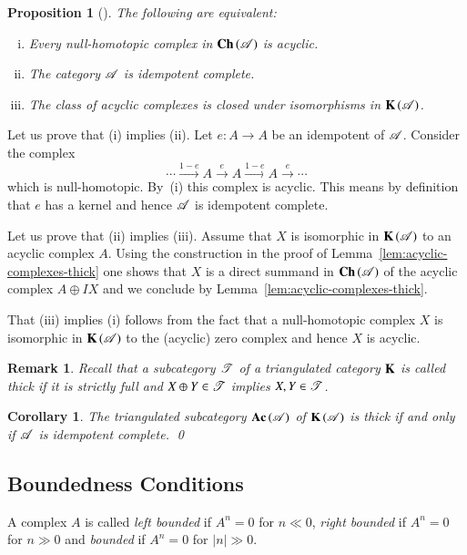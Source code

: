 \documentclass[1p]{elsarticle}
\makeatletter
\renewenvironment{proof}[1][\proofname]{\par
  \pushQED{\qed}%
  \normalfont \topsep6\p@\@plus6\p@\relax
  \trivlist
  \item[\hskip\labelsep
        \scshape
    #1\@addpunct{.}]\ignorespaces
}{%
  \popQED\endtrivlist\@endpefalse
}
\theoremstyle{mythm}
\newtheorem{Cor}[Thm]{Corollary}
\newtheorem{Prop}[Thm]{Proposition}
\theoremstyle{mydef}
\newtheorem{Rem}[Thm]{Remark}
\makeatother
\begin{document}
\begin{Prop}[{\cite[11.2]{MR1421815}}]
  \label{prop:ac-cxes-strictly-full-iff-karoubian}
  The following are equivalent:
  \begin{enumerate}[(i)]
    \item
      Every null-homotopic complex in $\operatorname{\mathbf{Ch}}{(\operatorname{\mathscr{A}})}$ is acyclic.
    \item
      The category $\operatorname{\mathscr{A}}$ is idempotent complete.
      
    \item
      The class of acyclic complexes is closed under isomorphisms in
      $\operatorname{\mathbf{K}}{(\operatorname{\mathscr{A}})}$.
  \end{enumerate}
\end{Prop}
\begin{proof}[Proof (Keller)]
  Let us prove that (i) implies (ii).
  Let $e:A \to A$ be an idempotent of $\operatorname{\mathscr{A}}$. 
  Consider the complex
  \[
  \cdots \xrightarrow{1-e} A \xrightarrow{e} A \xrightarrow{1-e} A
  \xrightarrow{e} \cdots
  \]
  which is null-homotopic. By~(i) this complex is acyclic.
  This means by definition that $e$ has a kernel and hence $\operatorname{\mathscr{A}}$ is
  idempotent complete.

  Let us prove that (ii) implies (iii). Assume that $X$ is isomorphic
  in $\operatorname{\mathbf{K}}{(\operatorname{\mathscr{A}})}$ to an acyclic complex $A$. Using the construction
  in the proof of Lemma~\ref{lem:acyclic-complexes-thick} one
  shows that $X$ is a direct summand in $\operatorname{\mathbf{Ch}}{(\operatorname{\mathscr{A}})}$ 
  of the acyclic complex $A \oplus IX$ and we conclude by
  Lemma~\ref{lem:acyclic-complexes-thick}.

  That (iii) implies (i) follows from the fact that a null-homotopic
  complex $X$ is isomorphic in $\operatorname{\mathbf{K}}{(\operatorname{\mathscr{A}})}$ to the (acyclic) 
  zero complex and hence $X$ is acyclic.
\end{proof}

\begin{Rem}
  Recall that a subcategory $\operatorname{\mathscr{T}}$ of a triangulated category $\operatorname{\mathbf{K}}$ 
  is called \emph{thick} if it is strictly full and $X \oplus Y \in
  \operatorname{\mathscr{T}}$ implies $X, Y \in \operatorname{\mathscr{T}}$.
\end{Rem}

\begin{Cor}
  \label{cor:idemp-compl=thick}
  The triangulated subcategory $\operatorname{\mathbf{Ac}}{(\operatorname{\mathscr{A}})}$ of $\operatorname{\mathbf{K}}{(\operatorname{\mathscr{A}})}$ is
  thick if and only if $\operatorname{\mathscr{A}}$ is idempotent complete. \qed
\end{Cor}


\subsection{Boundedness Conditions}
A complex $A$ is called \emph{left bounded} if $A^{n} = 0$ for $n \ll
0$, \emph{right bounded} if $A^{n} = 0$ for $n \gg 0$ and
\emph{bounded} if $A^{n} = 0$ for $|n| \gg 0$.
\end{document}
